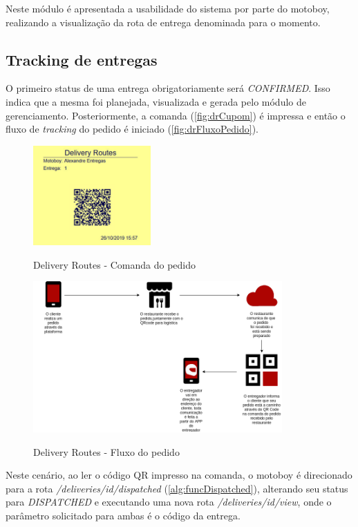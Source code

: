 Neste módulo é apresentada a usabilidade do sistema por parte do motoboy, realizando a visualização da rota de entrega denominada para o momento.

\subsection{Tracking de entregas}
O primeiro status de uma entrega obrigatoriamente será \textit{CONFIRMED}. Isso indica que a mesma foi planejada, visualizada e gerada pelo módulo de gerenciamento. Posteriormente, a comanda (\autoref{fig:drCupom}) é impressa e então o fluxo de \textit{tracking} do pedido é iniciado (\autoref{fig:drFluxoPedido}).

 \begin{figure}[H]
    \centering
    \caption{Delivery Routes - Comanda do pedido}
    \includegraphics[width=0.4\textwidth]{./dados/figuras/fig24}
    \label{fig:drCupom}
\end{figure}

\begin{figure}[H]
    \centering
    \caption{Delivery Routes - Fluxo do pedido}
    \includegraphics[width=0.85\textwidth]{./dados/figuras/fig25}
    \label{fig:drFluxoPedido}
\end{figure}

Neste cenário, ao ler o código QR impresso na comanda, o motoboy é direcionado para a rota \textit{/deliveries/{id}/dispatched} (\autoref{alg:funcDispatched}), alterando seu status para \textit{DISPATCHED} e executando uma nova rota \textit{/deliveries/{id}/view}, onde o parâmetro solicitado para ambas é o código da entrega.

